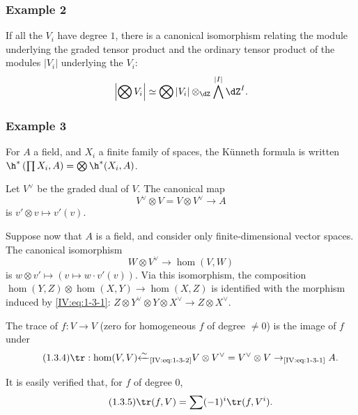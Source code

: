 \subsubsection*{\hypertarget{sga4half.e04.example.1-3-2}{Example 2}}

If all the $V_i$ have degree $1$, there is a canonical isomorphism relating
the module underlying the graded tensor product and the ordinary tensor
product of the modules $|V_i|$ underlying the $V_i$:
\[
  \left|\bigotimes V_i\right| \simeq \bigotimes |V_i|\otimes_{\dZ}\bigwedge^{|I|}\dZ^I \text{.}
\]






\subsubsection*{\hypertarget{sga4half.e04.example.1-3-3}{Example 3}}

For $A$ a field, and $X_i$ a finite family of spaces, the K\"unneth formula
is written
$\h^*\left(\prod X_i,A\right) = \bigotimes \h^*(X_i,A)$.

Let $V^\vee$ be the graded dual of $V$. The canonical map
\begin{equation*}\tag{1.3.1}\label{IV:eq:1-3-1}
  V^\vee\otimes V = V\otimes V^\vee \to A
\end{equation*}
is $v'\otimes v\mapsto v'(v)$.

Suppose now that $A$ is a field, and consider only finite-dimensional vector
spaces. The canonical isomorphism
\begin{equation*}\tag{1.3.2}\label{IV:eq:1-3-2}
  W\otimes V^\vee \to \hom(V,W)
\end{equation*}
is $w\otimes v'\mapsto \left(v\mapsto w\cdot v'(v)\right)$. Via this
isomorphism, the composition
$\hom(Y,Z)\otimes \hom(X,Y)\to \hom(X,Z)$ is identified with the morphism
induced by \eqref{IV:eq:1-3-1}:
$Z\otimes Y^\vee\otimes Y\otimes X^\vee \to Z\otimes X^\vee$.

The trace of $f:V\to V$ (zero for homogeneous $f$ of degree $\ne 0$) is
the image of $f$ under
\begin{equation*}\tag{1.3.4}\label{IV:eq:1-3-4}
  \tr:\hom(V,V) {\xleftarrow\sim}_\text{\eqref{IV:eq:1-3-2}} V\otimes V^\vee = V^\vee \otimes V \to_\text{\eqref{IV:eq:1-3-1}} A .
\end{equation*}

It is easily verified that, for $f$ of degree $0$,
\begin{equation*}\tag{1.3.5}\label{IV:eq:1-3-5}
  \tr(f,V) = \sum (-1)^i \tr(f,V^i) \text{.}
\end{equation*}

